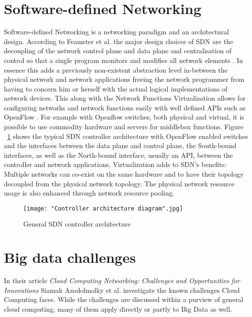 \documentclass{acm_proc_article-sp}
\begin{document}
\section{Software-defined Networking}

Software-defined Networking is a networking paradigm and an architectural design. According to Feamster et al. the major design choices of SDN are the decoupling of the network control plane and data plane and centralisation of control so that a single program monitors and modifies all network elements \cite{Feamster:2013:RS:2559899.2560327}. In essence this adds a previously non-existent abstraction level in-between the physical network and network applications freeing the network programmer from having to concern him or herself with the actual logical implementations of network devices. This along with the Network Functions Virtualization allows for configuring networks and network functions easily with well defined APIs such as OpenFlow \cite{McKeown-CCR2008}. For example with Openflow switches, both physical and virtual, it is possible to use commodity hardware and servers for middlebox functions. Figure ~\ref{fig:architecture} shows the typical SDN controller architecture with OpenFlow enabled switches and the interfaces between the data plane and control plane, the South-bound interfaces, as well as the North-bound interface, usually an API, between the controller and network applications. Virtualization adds to SDN's benefits: Multiple networks can co-exist on the same hardware and to have their topology decoupled from the physical network topology. \cite{Azodolmolky} The physical network resource usage is also enhanced through network resource pooling. 

\begin{figure}[ht!]
\centering
{}
\texttt{[image: "Controller architecture diagram".jpg]}
\caption{General SDN controller architecture}
\label{fig:architecture}
\end{figure} 




\section{Big data challenges}

In their article \textit{Cloud Computing Networking: Challenges and Opportunities for Innovations} \cite{Azodolmolky} Siamak Azodolmolky et al. investigate the known challenges Cloud Computing faces. While the challenges are discussed within a purview of general cloud computing, many of them apply directly or partly to Big Data as well.
\end{document}
